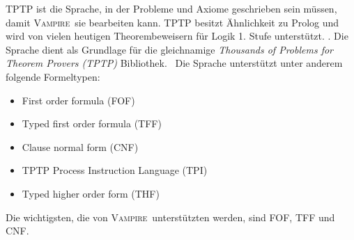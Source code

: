 \documentclass{article}
\newcommand{\vampire}{\textsc{Vampire}~}
\begin{document}
TPTP ist die Sprache, in der Probleme und Axiome geschrieben sein müssen, damit \vampire sie bearbeiten kann. TPTP besitzt Ähnlichkeit zu Prolog und wird von vielen heutigen Theorembeweisern für Logik 1. Stufe unterstützt. \cite[S. 4]{cav2013}. Die Sprache dient als Grundlage für die gleichnamige \textit{Thousands of Problems for Theorem Provers (TPTP)} Bibliothek.~\cite{tptphp} Die Sprache unterstützt unter anderem folgende Formeltypen:
\begin{itemize}
	\item First order formula (FOF)
	\item Typed first order formula (TFF)
	\item Clause normal form (CNF)
	\item TPTP Process Instruction Language  (TPI)
	\item Typed higher order form (THF)
\end{itemize}
Die wichtigsten, die von \vampire unterstützten werden, sind FOF, TFF und CNF.
\end{document}
